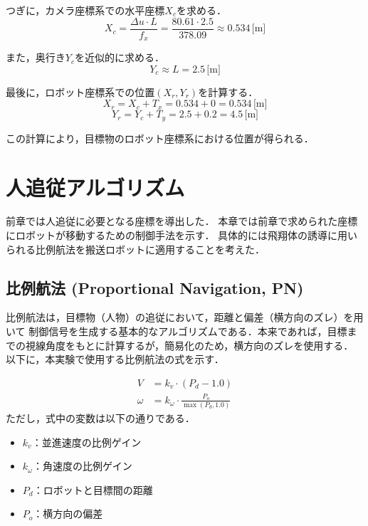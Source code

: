 つぎに，カメラ座標系での水平座標$X_c$を求める．
\begin{equation}
    X_c = \frac{\Delta u \cdot L}{f_x} = \frac{80.61 \cdot 2.5}{378.09} \approx 0.534 \, \text{[m]}
\end{equation}

また，奥行き$Y_c$を近似的に求める．
\begin{equation}
    Y_c \approx L = 2.5 \, \text{[m]}
\end{equation}

最後に，ロボット座標系での位置$(X_r, Y_r)$を計算する．
\begin{equation}
    X_r = X_c + T_x = 0.534 +0 = 0.534 \, \text{[m]}
\end{equation}
\begin{equation}
    Y_r = Y_c + T_y = 2.5 + 0.2 = 4.5 \, \text{[m]}
\end{equation}

この計算により，目標物のロボット座標系における位置が得られる．

\section{人追従アルゴリズム}
前章では人追従に必要となる座標を導出した．
本章では前章で求められた座標にロボットが移動するための制御手法を示す．
具体的には飛翔体の誘導に用いられる比例航法を搬送ロボットに適用することを考えた．

\subsection{比例航法 (Proportional Navigation, PN)}
比例航法は，目標物（人物）の追従において，距離と偏差（横方向のズレ）を用いて
制御信号を生成する基本的なアルゴリズムである．本来であれば，目標までの視線角度をもとに計算するが，簡易化のため，横方向のズレを使用する．
以下に，本実験で使用する比例航法の式を示す．

\begin{align}
    V      & = k_v \cdot (P_d - 1.0)                     \\
    \omega & = k_\omega \cdot \frac{P_o}{\max(P_d, 1.0)}
\end{align}
ただし，式中の変数は以下の通りである．
\begin{itemize}
    \item \(k_v\)：並進速度の比例ゲイン
    \item \(k_\omega\)：角速度の比例ゲイン
    \item \(P_d\)：ロボットと目標間の距離
    \item \(P_o\)：横方向の偏差
\end{itemize}

